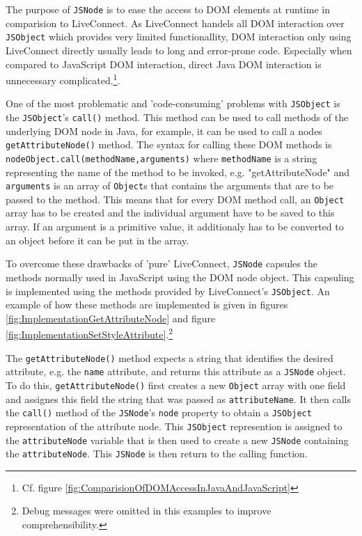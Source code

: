The purpose of \texttt{JSNode} is to ease the access to DOM elements at runtime in comparision to LiveConnect. As LiveConnect handels all DOM interaction over \texttt{JSObject} which provides very limited functionallity, DOM interaction only using LiveConnect directly usually leads to long and error-prone code. Especially when compared to JavaScript DOM interaction, direct Java DOM interaction is unnecessary complicated.\footnote{Cf. figure \ref{fig:ComparisionOfDOMAccessInJavaAndJavaScript}}. 

One of the most problematic and 'code-consuming' problems with \texttt{JSObject} is the \texttt{JSObject}'s \texttt{call()} method. This method can be used to call methods of the underlying DOM node in Java, for example, it can be used to call a nodes \texttt{getAttributeNode()} method. The syntax for calling these DOM methods is \texttt{nodeObject.call(methodName,arguments)} where \texttt{methodName} is a string representing the name of the method to be invoked, e.g. "getAttributeNode" and \texttt{arguments} is an array of \texttt{Object}s that contains the arguments that are to be passed to the method. This means that for every DOM method call, an \texttt{Object} array has to be created and the individual argument have to be saved to this array. If an argument is a primitive value, it additionaly has to be converted to an object before it can be put in the array. 

To overcome these drawbacks of 'pure' LiveConnect, \texttt{JSNode} capsules the methods normally used in JavaScript using the DOM node object. This capsuling is implemented using the methods provided by LiveConnect's \texttt{JSObject}. An example of how these methods are implemented is given in figures \ref{fig:ImplementationGetAttributeNode} and figure \ref{fig:ImplementationSetStyleAttribute}.\footnote{Debug messages were omitted in this examples to improve comprehensibility.}

The \texttt{getAttributeNode()} method expects a string that identifies the desired attribute, e.g. the \texttt{name} attribute, and returns this attribute as a \texttt{JSNode} object. To do this, \texttt{getAttributeNode()} first creates a new \texttt{Object} array with one field and assignes this field the string that was passed as \texttt{attributeName}. It then calls the \texttt{call()} method of the \texttt{JSNode}'s \texttt{node} property to obtain a \texttt{JSObject} representation of the attribute node. This \texttt{JSObject} represention is assigned to the \texttt{attributeNode} variable that is then used to create a new \texttt{JSNode} containing the \texttt{attributeNode}. This \texttt{JSNode} is then return to the calling function.

